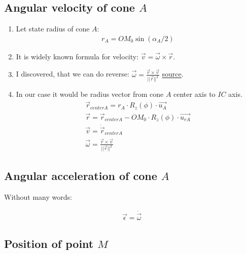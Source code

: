 \subsection{Angular velocity of cone $A$}

\begin{enumerate}
    \item Let state radius of cone $A$:
          \begin{align}
              r_A = OM_0 \sin({\alpha_A / 2})
          \end{align}
    \item It is widely known formula for velocity: $\vec{v} = \vec{\omega} \times \vec{r}$.
    \item I discovered, that we can do reverse: $\vec{\omega} = \frac{\vec{r} \times \vec{v}}{||\vec{r}||^2}$ \href{https://www.omnicalculator.com/physics/angular-velocity}{source}.
    \item In our case it would be radius vector from  cone $A$ center axis to $IC$ axis.
          \begin{align}
              \vec{r}_{centerA} = r_A \cdot  R_z(\phi) \cdot \vec{u_{A}}            \\
              \vec{r} = \vec{r}_{centerA} - OM_0 \cdot R_z(\phi) \cdot \vec{u_{rA}} \\
              \vec{v} = \dot{\vec{r}}_{centerA}                                     \\
              \vec{\omega} = \frac{\vec{r} \times \vec{v}}{||\vec{r}||^2}
          \end{align}

\end{enumerate}

\subsection{Angular acceleration of cone $A$}

Without many words:

\begin{align}
    \vec{\epsilon} = \dot{\vec{\omega}}
\end{align}

\subsection{Position of point $M$}

